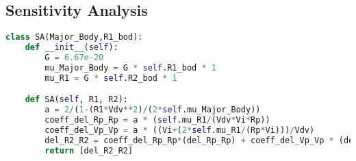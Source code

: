 \subsection{Sensitivity Analysis}
\begin{lstlisting}[language=python, caption=SA.py]
class SA(Major_Body,R1_bod):
    def __init__(self):
        G = 6.67e-20
        mu_Major_Body = G * self.R1_bod * 1
        mu_R1 = G * self.R2_bod * 1

    def SA(self, R1, R2):
        a = 2/(1-(R1*Vdv**2)/(2*self.mu_Major_Body))
        coeff_del_Rp_Rp = a * (self.mu_R1/(Vdv*Vi*Rp))
        coeff_del_Vp_Vp = a * ((Vi+(2*self.mu_R1/(Rp*Vi)))/Vdv)
        del_R2_R2 = coeff_del_Rp_Rp*(del_Rp_Rp) + coeff_del_Vp_Vp * (del_Vp_Vp)
        return [del_R2_R2]
\end{lstlisting}
